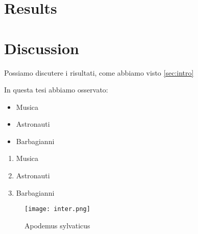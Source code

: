 \documentclass[12pt]{article}
\begin{document}
\section{Results}

\section{Discussion}
Possiamo discutere i risultati, come abbiamo visto \ref{sec:intro} %

In questa tesi abbiamo osservato:
\begin{itemize}
    \item Musica
    \item Astronauti
    \item Barbagianni
\end{itemize} %

\begin{enumerate} 
    \item Musica
    \item Astronauti
    \item Barbagianni
\end{enumerate}

\newpage %

\begin{figure}
    \centering %
    \texttt{[image: inter.png]} %
    \caption{Apodemus sylvaticus} %
    
\label{fig:apodemus} 
\end{figure}

\newpage %
\end{document}
